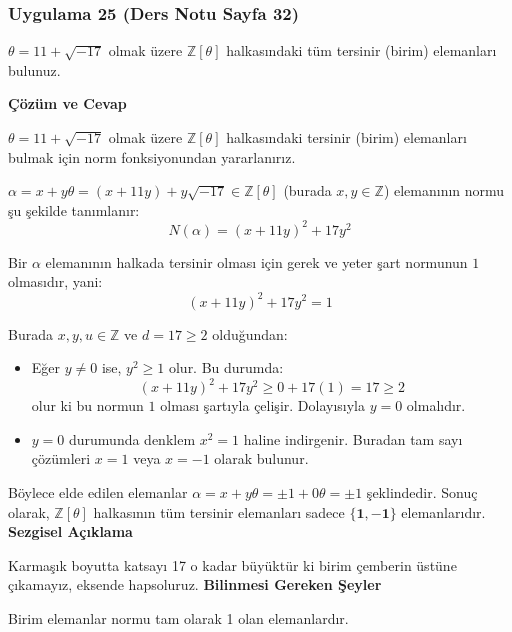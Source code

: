 \documentclass[11pt, a4paper]{article}
\newenvironment{cozum}{
    \vspace{0.5cm}
    \noindent\textcolor{green!60!black}{\faCheckCircle\enspace \textbf{\Large Çözüm ve Cevap}}\par\vspace{0.2cm}
}{}
\newenvironment{sezgisel}{
    \vspace{0.5cm}
    \noindent\textcolor{orange!80!black}{\faLightbulb\enspace \textbf{\Large Sezgisel Açıklama}}\par\vspace{0.2cm}
    \itshape
}{}
\newenvironment{bilgi}{
    \vspace{0.5cm}
    \noindent\textcolor{red!70!black}{\faExclamationTriangle\enspace \textbf{\Large Bilinmesi Gereken Şeyler}}\par\vspace{0.2cm}
}{}
\begin{document}
\subsubsection{Uygulama 25 (Ders Notu Sayfa 32)}
\begin{sorubox}
$\theta = 11 + \sqrt{-17}$ olmak üzere $\mathbb{Z}[\theta]$ halkasındaki tüm tersinir (birim) elemanları bulunuz.
\end{sorubox}
\begin{cozum}
$\theta = 11 + \sqrt{-17}$ olmak üzere $\mathbb{Z}[\theta]$ halkasındaki tersinir (birim) elemanları bulmak için norm fonksiyonundan yararlanırız.

$\alpha = x + y\theta = (x + 11y) + y\sqrt{-17} \in \mathbb{Z}[\theta]$ (burada $x, y \in \mathbb{Z}$) elemanının normu şu şekilde tanımlanır:
\[ N(\alpha) = (x + 11y)^2 + 17 y^2 \]

Bir $\alpha$ elemanının halkada tersinir olması için gerek ve yeter şart normunun $1$ olmasıdır, yani:
\[ (x + 11y)^2 + 17 y^2 = 1 \]

Burada $x, y, u \in \mathbb{Z}$ ve $d = 17 \ge 2$ olduğundan:
\begin{itemize}
    \item Eğer $y \neq 0$ ise, $y^2 \ge 1$ olur. Bu durumda:
    \[ (x + 11y)^2 + 17 y^2 \ge 0 + 17(1) = 17 \ge 2 \]
    olur ki bu normun $1$ olması şartıyla çelişir. Dolayısıyla $y = 0$ olmalıdır.
    \item $y = 0$ durumunda denklem $x^2 = 1$ haline indirgenir. Buradan tam sayı çözümleri $x = 1$ veya $x = -1$ olarak bulunur.
\end{itemize}

Böylece elde edilen elemanlar $\alpha = x + y\theta = \pm 1 + 0\theta = \pm 1$ şeklindedir. Sonuç olarak, $\mathbb{Z}[\theta]$ halkasının tüm tersinir elemanları sadece $\mathbf{\{1, -1\}}$ elemanlarıdır.
\end{cozum}
\begin{sezgisel}
Karmaşık boyutta katsayı 17 o kadar büyüktür ki birim çemberin üstüne çıkamayız, eksende hapsoluruz.
\end{sezgisel}
\begin{bilgi}
Birim elemanlar normu tam olarak 1 olan elemanlardır.
\end{bilgi}

\newpage
\end{document}
